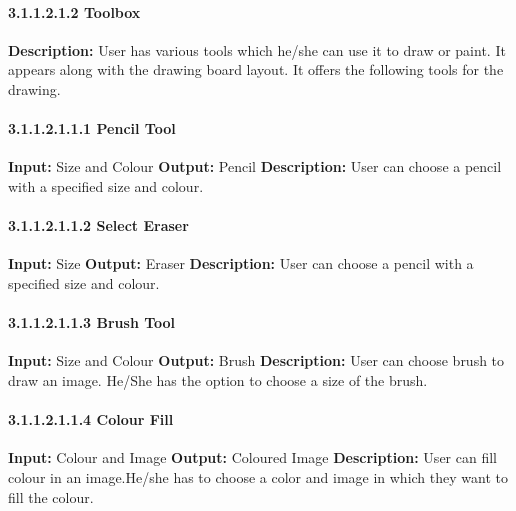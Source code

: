 \documentclass{scrreprt}
\begin{document}
\paragraph{3.1.1.2.1.2 Toolbox}
\hfill \vspace{2.5mm} \break 
\textbf{Description:} \newline
User has various tools which
he/she can use it to draw or paint. It appears along with the drawing board layout. It offers the following tools for the drawing.

\paragraph{3.1.1.2.1.1.1 Pencil Tool}
\hfill \vspace{2.5mm} \break 
\textbf{Input:} Size and Colour \newline
\textbf{Output:} Pencil
\vspace{1mm}\newline
\textbf{Description:} \newline 
User can choose a pencil with a specified size and colour.

\paragraph{3.1.1.2.1.1.2 Select Eraser}
\hfill \vspace{2.5mm} \break 
\textbf{Input:} Size \newline
\textbf{Output:} Eraser
\vspace{1mm}\newline
\textbf{Description:} \newline 
User can choose a pencil with a specified size and colour.

\paragraph{3.1.1.2.1.1.3 Brush Tool}
\hfill \vspace{2.5mm} \break 
\textbf{Input:} Size and Colour \newline
\textbf{Output:} Brush
\vspace{1mm}\newline
\textbf{Description:} \newline 
User can choose brush to draw an image. He/She has the option to choose a size of the brush.

\paragraph{3.1.1.2.1.1.4 Colour Fill}
\hfill \vspace{2.5mm} \break 
\textbf{Input:} Colour and Image \newline
\textbf{Output:} Coloured Image
\vspace{1mm}\newline
\textbf{Description:} \newline 
User can fill colour in an image.He/she has to choose a color and image in which they want to fill the colour.
\end{document}
